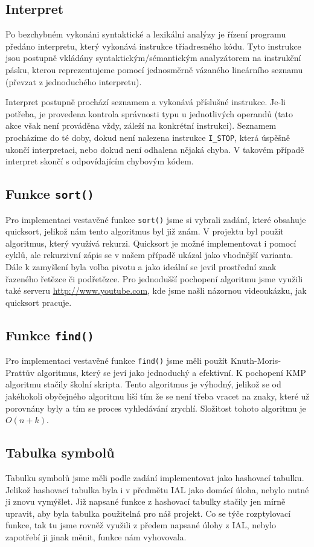 \documentclass[a4paper, 12pt]{article}[5.12.2012]
\begin{document}
\subsection{Interpret} \label{ss:interpret}
Po bezchybném vykonáni syntaktické a lexikální analýzy je řízení programu předáno interpretu, 
který vykonává instrukce tříadresného kódu. Tyto instrukce jsou postupně vkládány 
syntaktickým/sémantickým analyzátorem na instrukční pásku, kterou reprezentujeme pomocí 
jednosměrně vázaného lineárního seznamu (převzat z jednoduchého interpretu)\cite{b:interpret}.

Interpret postupně prochází seznamem a vykonává příslušné instrukce. Je-li potřeba, je provedena 
kontrola správnosti typu u jednotlivých operandů (tato akce však není prováděna vždy, záleží na
konkrétní instrukci). Seznamem procházíme do té doby, dokud není nalezena instrukce \texttt{I\_STOP}, která
úspěšně ukončí interpretaci, nebo dokud není odhalena nějaká chyba. V takovém případě interpret
skončí s odpovídajícím chybovým kódem.
\subsection{Funkce \texttt{sort()}} \label{ss:sort}
Pro implementaci vestavěné funkce \texttt{sort()} jsme si vybrali zadání, které obsahuje quick\-sort, jelikož 
nám tento algoritmus byl již znám. V projektu byl použit algoritmus, který využívá rekurzi. Quicksort je možné
implementovat i pomocí cyklů, ale rekurzivní zápis se v našem případě ukázal jako vhodnější varianta.
Dále k zamyšlení byla volba pivotu a jako ideální se jevil prostřední znak řazeného řetězce či podřetězce.
Pro jednodušší pochopení algoritmu jsme využili také serveru \url{http://www.youtube.com}, kde jsme našli názornou videoukázku,
jak quicksort pracuje. 

\subsection{Funkce \texttt{find()}} \label{ss:find}
Pro implementaci vestavěné funkce \texttt{find()} jsme měli použít Knuth-Moris-Prattův algoritmus, který se 
jeví jako jednoduchý a efektivní. K pochopení KMP algoritmu stačily školní skripta. Tento algoritmus 
je výhodný, jelikož se od jakéhokoli obyčejného algoritmu liší tím že se není třeba vracet na znaky, 
které už porovnány byly a tím se proces vyhledávání zrychlí. Složitost tohoto algoritmu je $O(n+k)$.
\subsection{Tabulka symbolů}
Tabulku symbolů jsme měli podle zadání implementovat jako hashovací tabulku. Jelikož hashovací tabulka 
byla i v předmětu IAL jako domácí úloha, nebylo nutné ji znovu vymýšlet. Již napsané funkce z hashovací 
tabulky stačily jen mírně upravit, aby byla tabulka použitelná pro náš projekt. Co se týče rozptylovací 
funkce, tak tu jsme rovněž využili z předem napsané úlohy z IAL, nebylo zapotřebí ji jinak měnit, funkce 
nám vyhovovala.
\end{document}
